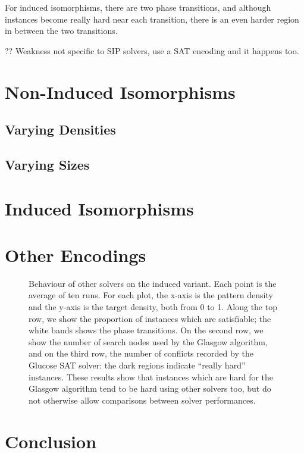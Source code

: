 \documentclass[letterpaper]{article}
\begin{document}
For induced isomorphisms, there are two phase transitions, and although instances become really hard
near each transition, there is an even harder region in between the two transitions.

?? Weakness not specific to SIP solvers, use a SAT encoding and it happens too.

\section{Non-Induced Isomorphisms}

\subsection{Varying Densities}

\subsection{Varying Sizes}

\section{Induced Isomorphisms}

\section{Other Encodings}

\begin{figure*}[tb]
    
    \caption{Behaviour of other solvers on the induced variant. Each point is the average of ten
        runs. For each plot, the x-axis is the pattern density and the y-axis is the target
        density, both from 0 to 1. Along the top row, we show the proportion of instances which are
        satisfiable; the white bands shows the phase transitions. On the second row, we show the
        number of search nodes used by the Glasgow algorithm, and on the third row, the number of
        conflicts recorded by the Glucose SAT solver: the dark regions indicate ``really hard''
        instances. These results show that instances which are hard for the Glasgow algorithm tend
        to be hard using other solvers too, but do not otherwise allow comparisons between solver
        performances.}
\end{figure*}

\section{Conclusion}



\end{document}
